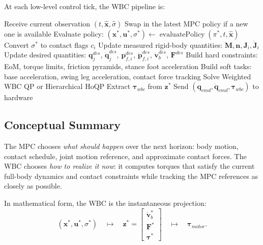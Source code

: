 \documentclass[11pt,a4paper]{article}
\begin{document}
At each low-level control tick, the WBC pipeline is:
\begin{algorithm}
	\caption{MPC--WBC Low-Level Control Tick}
	\begin{algorithmic}[1]
		\STATE Receive current observation $(t,\hat{\bm{x}},\hat{\sigma})$
		\STATE Swap in the latest MPC policy if a new one is available
		\STATE Evaluate policy:
		$(\bm{x}^{*},\bm{u}^{*},\sigma^{*})
		\leftarrow
		\operatorname{evaluatePolicy}(\pi^*,t,\hat{\bm{x}})$
		\STATE Convert $\sigma^{*}$ to contact flags $c_i$
		\STATE Update measured rigid-body quantities:
		$\bm{M},\bm{n},\bm{J}_i,\dot{\bm{J}}_i$
		\STATE Update desired quantities:
		$\bm{q}_j^{des}$, $\dot{\bm{q}}_j^{des}$,
		$\bm{p}_{f,i}^{des}$, $\dot{\bm{p}}_{f,i}^{des}$,
		$\dot{\bm{v}}_b^{des}$, $\bm{F}^{des}$
		\STATE Build hard constraints:
		EoM, torque limits, friction pyramids, stance foot acceleration
		\STATE Build soft tasks:
		base acceleration, swing leg acceleration, contact force tracking
		\STATE Solve Weighted WBC QP or Hierarchical HoQP
		\STATE Extract $\bm{\tau}_{wbc}$ from $\bm{z}^{*}$
		\STATE Send $(\bm{q}_{cmd},\dot{\bm{q}}_{cmd},\bm{\tau}_{wbc})$ to hardware
	\end{algorithmic}
\end{algorithm}

\subsection{Conceptual Summary}

The MPC chooses \emph{what should happen} over the next horizon: body motion, contact schedule, joint motion reference, and approximate contact forces. The WBC chooses \emph{how to realize it now}: it computes torques that satisfy the current full-body dynamics and contact constraints while tracking the MPC references as closely as possible.

In mathematical form, the WBC is the instantaneous projection:
\begin{equation}
	(\bm{x}^{*},\bm{u}^{*},\sigma^{*})
	\quad
	\longmapsto
	\quad
	\bm{z}^{*}
	=
	\begin{bmatrix}
		\dot{\bm{v}}_b^{*}\\
		\bm{F}^{*}\\
		\bm{\tau}^{*}
	\end{bmatrix}
	\quad
	\longmapsto
	\quad
	\bm{\tau}_{motor}.
\end{equation}
\end{document}
